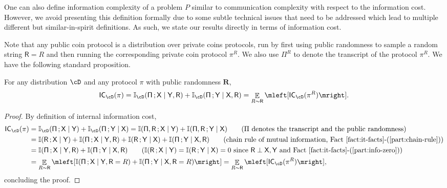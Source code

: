 \documentclass[11pt,letterpaper]{article}
\DeclareMathOperator*{\E}{\mathbb{E}}
\theoremstyle{definition}
\newcommand{\bracket}[1]{\mleft[#1\mright]}
\newcommand{\Prot}{\ensuremath{\Pi}}
\newcommand{\prot}{\ensuremath{\pi}}
\newcommand{\bR}{\bm{R}}
\newcommand{\rX}{\rv{X}}
\newcommand{\rY}{\rv{Y}}
\newcommand{\rv}[1]{\ensuremath{\mathsf{#1}}}
\newcommand{\II}{\ensuremath{\mathbb{I}}}
\newcommand{\mi}[2]{\ensuremath{\II(#1 \,; #2)}}
\newcommand{\itfacts}[1]{Fact~\ref{fact:it-facts}-(\ref{part:#1})\xspace}
\newcommand{\rProt}{\rv{\Prot}}
\newcommand{\rR}{\rv{R}}
\newcommand{\mii}[3]{\ensuremath{\II_{#3}(#1 \,; #2)}}
\newcommand{\ICost}[2]{\ensuremath{\textnormal{\textsf{IC}}_{#2}(#1)}\xspace}
\begin{document}
One can also define information complexity of a problem $P$ similar to communication complexity with respect to the information cost. However, we avoid presenting this definition formally due to some subtle technical issues
 that need to be addressed which lead to multiple different but similar-in-spirit definitions. As such, we state our results directly in terms of information cost. 

Note that any public coin protocol is a distribution over private coins protocols, run by
first using public randomness to sample a random string $\rR=R$ and then running the
corresponding private coin protocol $\prot^R$. We also use $\rProt^R$ to denote the transcript of the protocol $\prot^R$. 
We have the following standard proposition. 
\begin{proposition}\label{prop:public-random}
	 For any distribution $\cD$ and any protocol $\prot$ with public randomness $\bR$, $$\ICost{\prot}{\cD} = \mii{\rProt}{\rX \mid \rY, \rR}{\cD} + \mii{\rProt}{\rY \mid \rX, \rR}{\cD} = \E_{R \sim \rR}\bracket{\ICost{\prot^R}{\cD}}.$$ 
\end{proposition}
\begin{proof} By definition of internal information cost, 
\begin{align*}
	\ICost{\prot}{\cD} &= \mii{\rProt}{\rX \mid \rY}{\cD} + \mii{\rProt }{\rY \mid \rX}{\cD} = \mi{\rProt,\rR}{\rX \mid \rY} + \mi{\rProt,\rR}{\rY \mid \rX} \tag{$\Prot$ denotes the transcript and the public randomness} \\
	&= \mi{\rR}{\rX \mid \rY}  + \mi{\rProt}{\rX \mid \rY , \rR} + \mi{\rR}{\rY \mid \rX}  + \mi{\rProt}{\rY \mid \rX , \rR}  \tag{chain rule of mutual information, \itfacts{chain-rule}} \\
	&= \mi{\rProt}{\rX \mid \rY , \rR} + \mi{\rProt}{\rY \mid \rX , \rR} \tag{$\mi{\rR}{\rX \mid \rY}  = \mi{\rR}{\rY \mid \rX}  = 0$ since $\rR \perp \rX, \rY$ and \itfacts{info-zero}} \\
	&= \E_{R \sim \rR}\bracket{\mi{\rProt}{\rX \mid \rY , \rR=R} + \mi{\rProt}{\rY \mid \rX , \rR=R}} = \E_{R \sim \rR}\bracket{\ICost{\prot^R}{\cD}}, 
\end{align*}
concluding the proof.
\end{proof}
\end{document}
